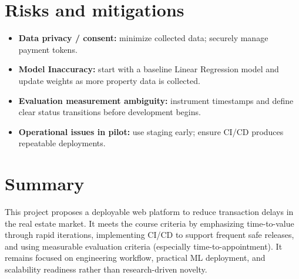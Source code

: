 \documentclass[11pt,a4paper]{article}
\begin{document}
\section{Risks and mitigations}
\begin{itemize}[leftmargin=0.7cm]
    \item \textbf{Data privacy / consent:} minimize collected data; securely manage payment tokens.
    \item \textbf{Model Inaccuracy:} start with a baseline Linear Regression model and update weights as more property data is collected.
    \item \textbf{Evaluation measurement ambiguity:} instrument timestamps and define clear status transitions before development begins.
    \item \textbf{Operational issues in pilot:} use staging early; ensure CI/CD produces repeatable deployments.
\end{itemize}

\section{Summary}
This project proposes a deployable web platform to reduce transaction delays in the real estate market. It meets the course criteria by emphasizing time-to-value through rapid iterations, implementing CI/CD to support frequent safe releases, and using measurable evaluation criteria (especially time-to-appointment). It remains focused on engineering workflow, practical ML deployment, and scalability readiness rather than research-driven novelty.
\end{document}
